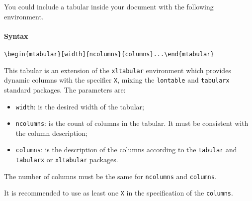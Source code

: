 \documentclass[book,taskpackage,specpackage,codepackage]{upmethodology-document}
\begin{document}
You could include a tabular inside your document with the following environment.

\paragraph{Syntax} \texttt{{\textbackslash}begin\{mtabular\}[width]\{ncolumns\}\{columns\}...{\textbackslash}end\{mtabular\}}

This tabular is an extension of the \texttt{xltabular} environment which provides dynamic columns with the specifier \texttt{X}, mixing the \texttt{lontable} and \texttt{tabularx} standard packages. The parameters are:
\begin{itemize}
\item \texttt{width}: is the desired width of the tabular;

\item \texttt{ncolumns}: is the count of columns in the tabular. It must be consistent with the column description;

\item \texttt{columns}: is the description of the columns according to the \texttt{tabular} and \texttt{tabularx} or \texttt{xltabular} packages.

\end{itemize}

\begin{upmcaution}
	The number of columns must be the same for \texttt{ncolumns} and \texttt{columns}.
\end{upmcaution}

\begin{upmnote}
	It is recommended to use as least one \texttt{X} in the specification of the \texttt{columns}.
\end{upmnote}
\end{document}
